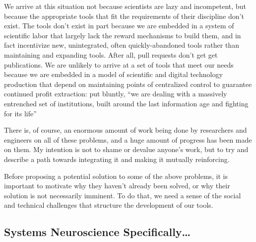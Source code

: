 \documentclass[11pt]{article}
\begin{document}
\begin{multicols}{2}
We arrive at this situation not because scientists are lazy and
incompetent, but because the appropriate tools that fit the requirements
of their discipline don't exist. The tools don't exist in part because
we are embedded in a system of scientific labor that largely lack the
reward mechanisms to build them, and in fact incentivize new,
unintegrated, often quickly-abandoned tools rather than maintaining and
expanding tools. After all, pull requests don't get get publications. We
are unlikely to arrive at a set of tools that meet our needs because we
are embedded in a model of scientific and digital technology production
that depend on maintaining points of centralized control to guarantee
continued profit extraction: put bluntly, ``we are dealing with a
massively entrenched set of institutions, built around the last
information age and fighting for its life'' \cite{bowkerInformationInfrastructureStudies2010} 

There is, of course, an enormous amount of work being done by
researchers and engineers on all of these problems, and a huge amount of
progress has been made on them. My intention is not to shame or devalue
anyone's work, but to try and describe a path towards integrating it and
making it mutually reinforcing.

Before proposing a potential solution to some of the above problems, it
is important to motivate why they haven't already been solved, or why
their solution is not necessarily imminent. To do that, we need a sense
of the social and technical challenges that structure the development of
our tools. 
\end{multicols}


\hypertarget{systems-neuroscience-specifically}{%
\subsection{Systems Neuroscience
Specifically\ldots{}}\label{systems-neuroscience-specifically}}
\end{document}
